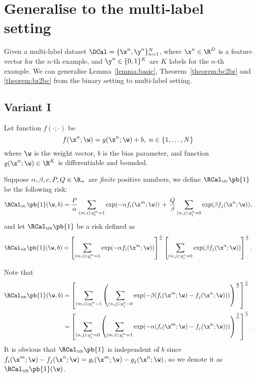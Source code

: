 \section{Generalise to the multi-label setting}
\label{sec:ml}

Given a multi-label dataset $\DCal = \{\x^n, \y^n\}_{n=1}^N$, where $\x^n \in \R^D$ is a feature vector for the $n$-th example,
and $\y^n \in \{0,1\}^K$ are $K$ labels for the $n$-th example.
We can generalise Lemma~\ref{lemma:basic}, Theorem~\ref{theorem:bc2br} and \ref{theorem:br2bc} from the binary setting to multi-label setting.

\subsection{Variant I}

Let function $f(\cdot; \cdot)$ be
$$
f(\x^n; \w) = g(\x^n; \w) + b, \ n \in \{1,\dots,N\}
$$
where $\w$ is the weight vector, $b$ is the bias parameter,
and function $g(\x^n; \w) \in \R^K$ is differentiable and bounded.

Suppose $\alpha, \beta, c, P, Q \in \R_+$ are \emph{finite} positive numbers, 
we define $\RCal_\textsc{mc}\pb{1}$ be the following risk:
\begin{equation}
\label{eq:mc1}
\RCal_\textsc{mc}\pb{1}(\w, b) 
= \frac{P}{\alpha} \sum_{(m,i): y_i^m = 1} \exp(-\alpha f_i(\x^m; \w)) \, + \,
  \frac{Q}{\beta}  \sum_{(n,j): y_j^n = 0} \exp( \beta  f_j(\x^n; \w)),
\end{equation}
and let $\RCal_\textsc{mr}\pb{1}$ be a risk defined as
\begin{equation}
\label{eq:mr1}
\RCal_\textsc{mr}\pb{1}(\w, b) 
= \left[ \sum_{(m,i): y_i^m = 1} \exp(-\alpha f_i(\x^m; \w)) \right]^\frac{c}{\alpha}  
  \left[ \sum_{(n,j): y_j^n = 0} \exp( \beta  f_j(\x^n; \w)) \right]^\frac{c}{\beta}.
\end{equation}

Note that 
\begin{equation}
\label{eq:mr_derive}
\begin{aligned}
\RCal_\textsc{mr}\pb{1}(\w, b) 
&= \left[ \sum_{(m,i): y_i^m = 1} \left( \sum_{(n,j): y_j^n = 0} 
   \exp(-\beta(f_i(\x^m; \w) - f_j(\x^n; \w) ) ) \right)^\frac{\alpha}{\beta} \right]^\frac{c}{\alpha} \\
&= \left[ \sum_{(n,j): y_j^n = 0} \left( \sum_{(m,i): y_i^m = 1} 
   \exp(-\alpha( f_i(\x^m; \w) - f_j(\x^n; \w) ) ) \right)^\frac{\beta}{\alpha} \right]^\frac{c}{\beta}.
\end{aligned}
\end{equation}
It is obvious that $\RCal_\textsc{mr}\pb{1}$ is independent of $b$ since $f_i(\x^m; \w) - f_j(\x^n; \w) = g_i(\x^m; \w) - g_j(\x^n; \w)$,
so we denote it as $\RCal_\textsc{mr}\pb{1}(\w)$.


